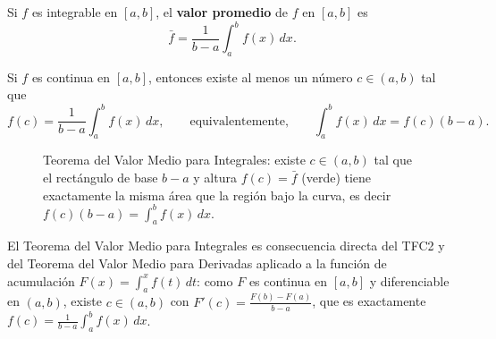 \begin{definition}
Si $f$ es integrable en $[a,b]$, el \textbf{valor promedio} de $f$ en $[a,b]$ es
\[
\bar{f} = \frac{1}{b-a}\int_{a}^{b} f(x)\,dx.
\]
\end{definition}

\begin{theorem}
Si $f$ es continua en $[a,b]$, entonces existe al menos un número $c \in (a,b)$ tal que
\[
f(c) = \frac{1}{b-a}\int_{a}^{b} f(x)\,dx, \qquad \text{equivalentemente,} \qquad \int_{a}^{b} f(x)\,dx = f(c)(b-a).
\]
\end{theorem}

\begin{figure}[!htbp]
\centering
{}
\caption{Teorema del Valor Medio para Integrales: existe $c\in(a,b)$ tal que
el rectángulo de base $b-a$ y altura $f(c)=\bar f$ (verde) tiene exactamente
la misma área que la región bajo la curva, es decir
$f(c)(b-a)=\int_a^b f(x)\,dx$.}
\label{fig:tvm_integrales}
\end{figure}

\begin{rem}
El Teorema del Valor Medio para Integrales es consecuencia directa del TFC2 y del Teorema del Valor Medio para Derivadas aplicado a la función de acumulación $F(x) = \int_a^x f(t)\,dt$: como $F$ es continua en $[a,b]$ y diferenciable en $(a,b)$, existe $c \in (a,b)$ con $F'(c) = \frac{F(b)-F(a)}{b-a}$, que es exactamente $f(c) = \frac{1}{b-a}\int_a^b f(x)\,dx$.
\end{rem}

